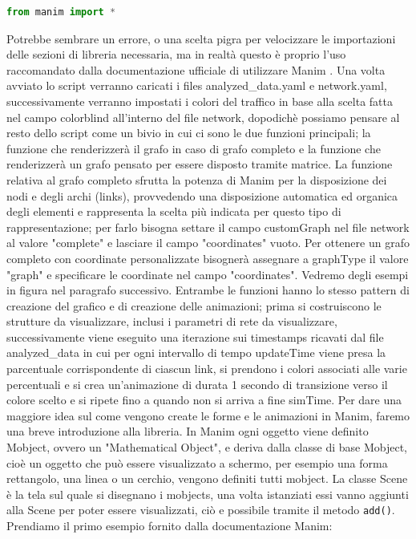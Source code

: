 \documentclass[binding=0.6cm]{sapthesis}
\begin{document}
{\scriptsize
\begin{lstlisting}[language=Python]
    from manim import *
\end{lstlisting}
}

Potrebbe sembrare un errore, o una scelta pigra per velocizzare le importazioni delle sezioni di libreria necessaria, ma in realtà questo è proprio
l'uso raccomandato dalla documentazione ufficiale di utilizzare Manim \cite{ManimDocs}.
Una volta avviato lo script verranno caricati i files analyzed\_data.yaml e network.yaml, successivamente verranno impostati i colori del traffico in base
alla scelta fatta nel campo colorblind all'interno del file network, dopodichè possiamo pensare al resto dello script come un bivio in cui ci sono le due funzioni principali;
la funzione che renderizzerà il grafo in caso di grafo completo e la funzione che renderizzerà un grafo pensato per essere disposto
tramite matrice. La funzione relativa al grafo completo sfrutta la potenza di Manim per la disposizione dei nodi e degli archi (links), provvedendo
una disposizione automatica ed organica degli elementi e rappresenta la scelta più indicata per questo tipo di rappresentazione; per
farlo bisogna settare il campo customGraph nel file network al valore "complete" e lasciare il campo "coordinates" vuoto. Per ottenere un grafo
completo con coordinate personalizzate bisognerà assegnare a graphType il valore "graph" e specificare le coordinate nel campo "coordinates". 
Vedremo degli esempi in figura nel paragrafo successivo. Entrambe le funzioni hanno lo stesso pattern di creazione del grafico e di creazione delle animazioni;
prima si costruiscono le strutture da visualizzare, inclusi i parametri di rete da visualizzare, successivamente viene eseguito una iterazione sui timestamps ricavati
dal file analyzed\_data in cui per ogni intervallo di tempo updateTime viene presa la parcentuale corrispondente di ciascun link, 
si prendono i colori associati alle varie percentuali e si crea un'animazione di durata 1 secondo di transizione verso il colore scelto e si ripete 
fino a quando non si arriva a fine simTime.
Per dare una maggiore idea sul come vengono create le forme e le animazioni in Manim, faremo una breve introduzione alla libreria.
In Manim ogni oggetto viene definito Mobject, ovvero un "Mathematical Object", e deriva dalla classe di base Mobject, cioè un oggetto che può essere visualizzato a schermo,
per esempio una forma rettangolo, una linea o un cerchio, vengono definiti tutti mobject.
La classe Scene è la tela sul quale si disegnano i mobjects, una volta istanziati essi vanno aggiunti alla Scene per poter essere visualizzati,
ciò e possibile tramite il metodo \lstinline|add()|. Prendiamo il primo esempio fornito dalla documentazione Manim:
\end{document}
